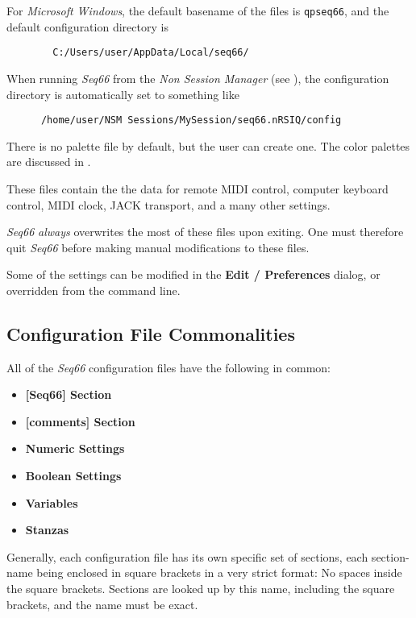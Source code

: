    For \textsl{Microsoft Windows}, the default basename of the files is
   \texttt{qpseq66}, and the default configuration directory is

   \begin{verbatim}
        C:/Users/user/AppData/Local/seq66/
   \end{verbatim}

   When running \textsl{Seq66} from the \textsl{Non Session Manager}
   (see ),
   the configuration directory is automatically set to something like

   \begin{verbatim}
      /home/user/NSM Sessions/MySession/seq66.nRSIQ/config
   \end{verbatim}

   There is no palette file by default, but the user can create one.
   The color palettes are discussed in .

   These files contain the the data for remote MIDI control, computer keyboard
   control, MIDI clock, JACK transport, and a many other settings.

   \textsl{Seq66} \textsl{always} overwrites the most of these files upon
   exiting.  One must therefore quit \textsl{Seq66} before making
   manual modifications to these files.

   Some of the settings can be modified in the \textbf{Edit / Preferences}
   dialog, or overridden from the command line.

\subsection{Configuration File Commonalities}
\label{subsec:configuration_file_commonalities}

   All of the \textsl{Seq66} configuration files have the following in common:

   \begin{itemize}
      \item \textbf{[Seq66] Section}
      \item \textbf{[comments] Section}
      \item \textbf{Numeric Settings}
      \item \textbf{Boolean Settings}
      \item \textbf{Variables}
      \item \textbf{Stanzas}
   \end{itemize}

   Generally, each configuration file has its own specific set
   of sections, each section-name being enclosed in square brackets in a very
   strict format:  No spaces inside the square brackets.  Sections are looked up
   by this name, including the square brackets, and the name must be exact.

